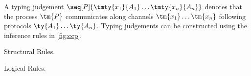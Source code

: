 \begin{definition}\label{def:ccp-typing}
  A typing judgement $\seq[P]{\tmty{x_1}{A_1}\dots\tmty{x_n}{A_n}}$ denotes that
  the process $\tm{P}$ communicates along channels $\tm{x_1}\dots\tm{x_n}$
  following protocols $\ty{A_1}\dots\ty{A_n}$.
  Typing judgements can be constructed using the inference rules in
  \cref{fig:ccp}.
\end{definition}
\begin{figure*}[!htb]
  Structural Rules.
  \begin{center} \ccpInfAx    \ccpInfCycle \end{center}\vspace*{1\baselineskip}
  \begin{center} \ccpInfMix   \ccpInfHalt  \end{center}\vspace*{1\baselineskip}

  Logical Rules.
  \begin{center} \ccpInfTens  \ccpInfParr  \end{center}\vspace*{1\baselineskip}
  \begin{center} \ccpInfOne   \ccpInfBot   \end{center}\vspace*{1\baselineskip}
  \begin{center}   \end{center}\vspace*{1\baselineskip}
  \begin{center} \ccpInfWith               \end{center}\vspace*{1\baselineskip}
  \begin{center} \ccpInfNil   \ccpInfTop   \end{center} 
  
  \caption{Priority-based Classical Processes}
  \label{fig:ccp}
\end{figure*}
